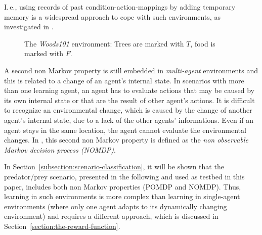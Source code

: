 I.\,e., using records of past condition-action-mappings by adding temporary memory is a widespread approach to cope with such environments, as investigated in \cite{Lan98,LW00}.

\begin{figure}[ht]
  \hfill
  \hfill
  \caption{The \emph{Woods101} environment: Trees are marked with $T$, food is marked with $F$.}
  \label{figure:woods101}
\end{figure}

A second non Markov property is still embedded in \emph{multi-agent} environments and this is related to a change of an agent's internal state. In scenarios with more than one learning agent, an agent has to evaluate actions that may be caused by its own internal state or that are the result of other agent's actions. It is difficult to recognize an environmental change, which is caused by the change of another agent's internal state, due to a lack of the other agents' informations. Even if an agent stays in the same location, the agent cannot evaluate the environmental changes. In \cite{TTS01}, this second non Markov property is defined as the \emph{non observable Markov decision process (NOMDP)}. 

In Section~\ref{subsection:scenario-classification}, it will be shown that the predator/prey scenario, presented in the following and used as testbed in this paper, includes both non Markov properties (POMDP and NOMDP). Thus, learning in such environments is more complex than learning in single-agent environments (where only one agent adapts to its dynamically changing environment) and requires a different approach, which is discussed in Section~\ref{section:the-reward-function}.
